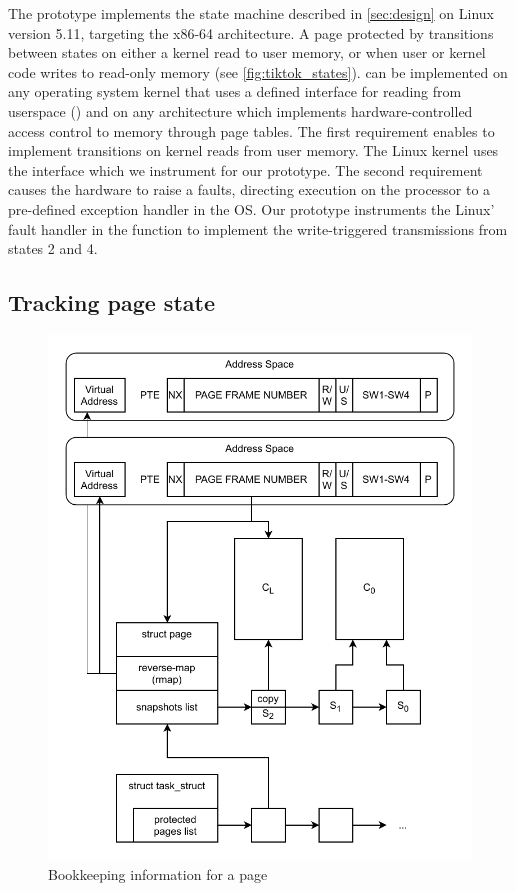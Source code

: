 \documentclass[letterpaper,twocolumn,10pt, anonymous]{article}
\begin{document}
The \tiktok prototype implements the state machine described in 
\autoref{sec:design} on Linux version 5.11, targeting the x86-64 
architecture. 
A page protected by \tiktok transitions between states on 
either a kernel read to user memory, or when user or kernel code
writes to read-only memory (see \autoref{fig:tiktok_states}).
\tiktok can be implemented on any operating system kernel that uses 
a defined interface for reading from userspace () and
on any architecture which implements hardware-controlled access 
control to memory through page tables. 
The first requirement enables \tiktok to implement transitions on 
kernel reads from user memory.
The Linux kernel uses the  interface which 
we instrument for our prototype.
The second requirement causes the hardware to raise a faults, 
directing execution on the processor to a pre-defined exception 
handler in the OS.
Our prototype instruments the Linux' fault handler in the function 
 to implement the write-triggered transmissions 
from states 2 and 4.


\subsection{Tracking page state}

\begin{figure}[]
  \includegraphics[width=\linewidth]{img/book-keeping.pdf}
  \caption{Bookkeeping information for a page}
  \label{fig:tiktok_bookeeping}
\end{figure}
\end{document}
